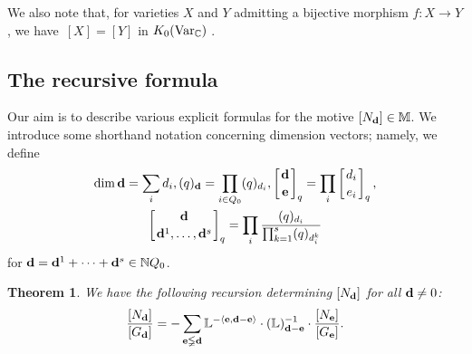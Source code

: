 \documentclass[pdftex]{sigma}
\numberwithin{equation}{section}
\newtheorem{Theorem}{Theorem}[section]
\theoremstyle{definition}
\begin{document}
We also note that, for varieties $X$ and $Y$ admitting a bijective morphism $f\colon X\rightarrow Y$, we have~${[X]=[Y]}$ in $K_0({\rm Var}_\mathbb{C})$ \cite[Lemma~2.9]{B}.

\subsection{The recursive formula}

Our aim is to describe various explicit formulas for the motive $[N_{\bf d}]\in \mathbb{M}$. We introduce some shorthand notation concerning dimension vectors; namely, we define
\begin{gather*}
\dim {\bf d}=\sum_id_i, (q)_{\bf d}=\prod_{i\in Q_0}(q)_{d_i}, \left[{{\bf d}\atop{\bf e}}\right]_q=\prod_{i}\left[{d_i\atop e_i}\right]_q,\\
 \left[{{\bf d}\atop{{\bf d}^1,\dots,{\bf d}^s}}\right]_q=\prod_i\frac{(q)_{d_i}}{\prod_{k=1}^s(q)_{d^k_i}}\end{gather*}
for ${\bf d}={\bf d}^1+\dots+{\bf d}^s\in\mathbb{N}Q_0$.


\begin{Theorem}\label{thm1} We have the following recursion determining $[N_{\bf d}]$ for all ${\bf d}\not=0$:
\[\frac{[N_{\bf d}]}{[G_{\bf d}]}=-\sum_{{\bf e}\lneqq{\bf d}}\mathbb{L}^{-\langle{\bf e},{\bf d}-{\bf e}\rangle}\cdot(\mathbb{L})_{{\bf d}-{\bf e}}^{-1}\cdot\frac{[N_{\bf e}]}{[G_{\bf e}]}.\]
\end{Theorem}
\end{document}
